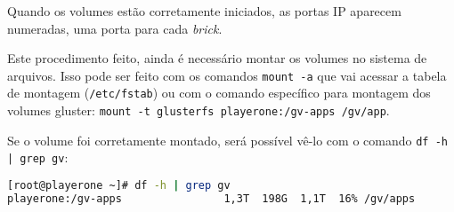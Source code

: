 Quando os volumes estão corretamente iniciados, as portas IP aparecem numeradas,
uma porta para cada \textit{brick}.

Este procedimento feito, ainda é necessário montar os volumes no sistema de arquivos. Isso pode ser feito com os comandos \texttt{mount -a} que vai acessar a tabela de montagem (\texttt{/etc/fstab}) ou com o comando específico para montagem dos volumes gluster: \texttt{mount -t glusterfs playerone:/gv-apps /gv/app}.

Se o volume foi corretamente montado, será possível vê-lo com o comando \texttt{df -h | grep gv}:

\begin{lstlisting}[language=bash,basicstyle=\small]
[root@playerone ~]# df -h | grep gv
playerone:/gv-apps                1,3T  198G  1,1T  16% /gv/apps
\end{lstlisting}




